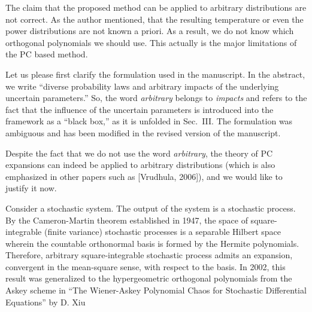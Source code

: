 \begin{reviewer}
The claim that the proposed method can be applied to arbitrary distributions are not correct. As the author mentioned, that the resulting temperature or even the power distributions are not known a priori. As a result, we do not know which orthogonal polynomials we should use. This actually is the major limitations of the PC based method.
\end{reviewer}
\begin{authors}
Let us please first clarify the formulation used in the manuscript.
In the abstract, we write ``diverse probability laws and arbitrary impacts of the underlying uncertain parameters.''
So, the word \emph{arbitrary} belongs to \emph{impacts} and refers to the fact that the influence of the uncertain parameters is introduced into the framework as a ``black box,'' as it is unfolded in Sec.~III.
The formulation was ambiguous and has been modified in the revised version of the manuscript.

Despite the fact that we do not use the word \emph{arbitrary}, the theory of PC expansions can indeed be applied to arbitrary distributions (which is also emphasized in other papers such as [Vrudhula, 2006]), and we would like to justify it now.

Consider a stochastic system.
The output of the system is a stochastic process.
By the Cameron-Martin theorem established in 1947, the space of square-integrable (finite variance) stochastic processes is a separable Hilbert space wherein the countable orthonormal basis is formed by the Hermite polynomials.
Therefore, arbitrary square-integrable stochastic process admits an expansion, convergent in the mean-square sense, with respect to the basis.
In 2002, this result was generalized to the hypergeometric orthogonal polynomials from the Askey scheme in ``The Wiener-Askey Polynomial Chaos for Stochastic Differential Equations'' by D. Xiu \etal


\end{authors}
